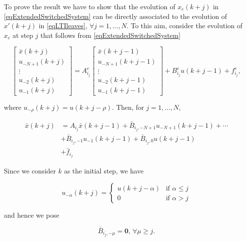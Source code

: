 \documentclass[letterpaper, 10 pt, conference]{ifacconf}  %
\begin{document}
\begin{pf}
	To prove the result we have to show that the evolution of $x_e(k+j)$ in \eqref{eqExtendedSwitchedSystem} can be directly associated to the evolution of $x'(k+j)$ in \eqref{eqLTIleaves}, $\forall j=1,\ldots,N$. To this aim, consider the evolution of $x_e$ at step $j$ that follows from \eqref{eqExtendedSwitchedSystem}
	
	\small
	\begin{equation}
	\left[\begin{array}{c}
	\bar x(k+j) \\
	u_{-N+1}(k+j)\\
	\vdots\\
	u_{-2}(k+j)\\
	u_{-1}(k+j)
	\end{array}\right] = A_{i_j}^e	
	\left[\begin{array}{c}
	\bar x(k+j-1) \\
	u_{-N+1}(k+j-1)\\
	\vdots\\
	u_{-2}(k+j-1)\\
	u_{-1}(k+j-1)
	\end{array}\right]+ B_{i_j}^e u(k+j-1) + f^e_{i_j},		
	\end{equation}
	\normalsize
	
	where $u_{-\rho}(k+j) = u(k+j-\rho)$. Then, for $j=1,\ldots,N$,
	
	\small
	\begin{align}\label{eqBarxInit}
	\nonumber\bar x(k+j) &= A_{i_j}\bar x(k+j-1) + \bar B_{i_j,-N+1}u_{-N+1}(k+j-1)+ \cdots\\
	& +  \bar B_{i_j,-1}u_{-1}(k+j-1) + \bar B_{i_j,0}u(k+j-1)\\
	\nonumber &+ \bar f_{i_j}
	\end{align}
	\normalsize
	
	Since we consider $k$ as the initial step, we have
	
	\small
	\begin{equation}
	u_{-\alpha}(k+j) =\begin{cases}
	u(k+j-\alpha) &\mbox{if } \alpha \leq j\\
	0             &\mbox{if } \alpha > j
	\end{cases}
	\end{equation}	
	\normalsize
	
	and hence we pose
	
	\small
	\begin{equation}\label{eqBarBij0}
	\bar B_{i_j,-\mu} = \mathbf{0},\,\forall\mu\geq j.
	\end{equation}
	\normalsize
	

\end{pf}
\end{document}
